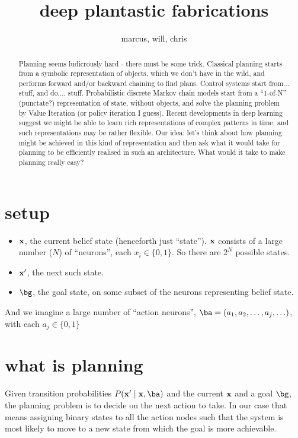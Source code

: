 \documentclass[11pt]{article}
\title{deep plantastic fabrications}
\author{marcus, will, chris}
\date{}
\begin{document}
\maketitle

\begin{abstract}
 Planning seems ludicrously hard - there must be some trick. Classical planning starts from a symbolic representation of objects, which we don't have in the wild, and performs forward and/or backward chaining to find plans. Control systems start from... stuff, and do.... stuff. Probabilistic discrete Markov chain models start from a ``1-of-N'' (punctate?) representation of state, without objects, and solve the planning problem by Value Iteration (or policy iteration I guess). Recent developments in deep learning suggest we might be able to learn rich representations of complex patterns in time, and such representations may be rather flexible. Our idea: let's think about how planning might be achieved in this kind of representation and then ask what it would take for planning to be efficiently realised in such an architecture. What would it take to make planning really easy?
\end{abstract}

\section{setup}
\begin{itemize}
 \item $\mathbf{x}$, the current belief state (henceforth just ``state''). $\mathbf{x}$ consists of a large number ($N$) of ``neurons'', each $x_i \in \{0,1\}$. So there are $2^N$ possible states.
 \item $\mathbf{x}^\prime$, the next such state.
 \item $\bg$, the goal state, on some subset of the neurons representing belief state.
\end{itemize}

And we imagine a large number of ``action neurons'', $\ba = (a_1, a_2, \ldots, a_j,\ldots)$, with each $a_j \in \{0,1\}$


\section{what is planning}
Given transition probabilities $P(\bx^\prime \mid \bx, \ba)$ and the current $\mathbf{x}$ and a goal $\bg$, the planning problem is to decide on the next action to take. In our case that means assigning binary states to all the action nodes such that the system is most likely to move to a new state from which the goal is more achievable.
\end{document}
